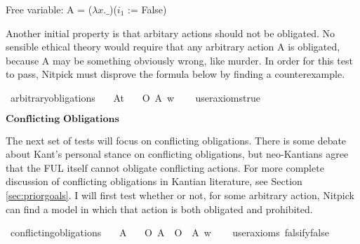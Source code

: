 \begin{isabellebody}
{  Free variable:
    A = ($\lambda x. \_$)($i_1$ := False)\color{black}%
}\isanewline
%
%
\endisatagproof
{\isafoldproof}%
%
\isadelimproof
%
\endisadelimproof
%
\begin{isamarkuptext}%
Another initial property is that arbitary actions should not be obligated. No sensible ethical
theory would require that any arbitrary action A is obligated, because A may be something obviously wrong,
like murder. In order for this test to pass, Nitpick must disprove the formula below by finding a counterexample.%
\end{isamarkuptext}\isamarkuptrue%
\isamarkupfalse%
\ arbitrary{\isacharunderscore}obligations{\isacharcolon}\isanewline
\ \ \ A{\isacharcolon}{\isacharcolon}{\isachardoublequoteopen}t{\isachardoublequoteclose}\isanewline
\ \ \ {\isachardoublequoteopen}O\ {\isacharbraceleft}A{\isacharbraceright}\ w{\isachardoublequoteclose}\isanewline
\ \ \isamarkupfalse%
\ {\isacharbrackleft}user{\isacharunderscore}axioms{\isacharequal}true{\isacharbrackright}%
\isadelimproof
\ %
\endisadelimproof
%
\isatagproof
{}\isamarkupfalse%
\isanewline
%
\isanewline
%
%
\endisatagproof
{\isafoldproof}%
%
\isadelimproof
%
\endisadelimproof
%
\begin{isamarkuptext}%
$\textbf{Conflicting Obligations}$%
\end{isamarkuptext}\isamarkuptrue%
%
\begin{isamarkuptext}%
The next set of tests will focus on conflicting obligations. There is some debate about Kant's
personal stance on conflicting obligations, but neo-Kantians agree that the FUL itself cannot obligate
conflicting actions. For more complete discussion of conflicting obligations in Kantian literature, 
see Section \ref{sec:priorgoals}. I will first test whether or not, for some arbitrary action, Nitpick can find
a model in which that action is both obligated and prohibited.%
\end{isamarkuptext}\isamarkuptrue%
\isamarkupfalse%
\ conflicting{\isacharunderscore}obligations{\isacharcolon}\isanewline
\ \ \ A\isanewline
\ \ \ {\isachardoublequoteopen}{\isacharparenleft}O\ {\isacharbraceleft}A{\isacharbraceright}\ \isactrlbold {\isasymand}\ O\ {\isacharbraceleft}\isactrlbold {\isasymnot}\ A{\isacharbraceright}{\isacharparenright}\ w{\isachardoublequoteclose}\isanewline
\ \ \isamarkupfalse%
\ {\isacharbrackleft}user{\isacharunderscore}axioms{\isacharcomma}\ falsify{\isacharequal}false{\isacharbrackright}%
\isadelimproof
\ %
\endisadelimproof
%
\isatagproof
{}\isamarkupfalse%
\isanewline
%
\end{isabellebody}
